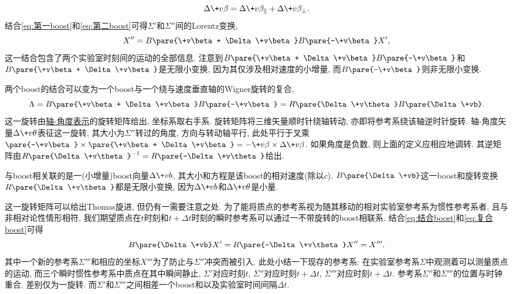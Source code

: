 \documentclass[hidelinks]{ctexart}
\begin{document}
\[ \Delta \+v\beta = \Delta \+v\beta_\parallel + \Delta \+v\beta_\perp. \]
结合\eqref{eq:第一boost}和\eqref{eq:第二boost}可得$\Sigma'$和$\Sigma''$间的Lorentz变换,
\begin{equation}
    \label{eq:结合boost}
    X'' = B\pare{\+v\beta + \Delta \+v\beta}B\pare{-\+v\beta}X',
\end{equation}
这一结合包含了两个实验室时刻间的运动的全部信息. 注意到$B\pare{\+v\beta + \Delta \+v\beta}B\pare{-\+v\beta}$和$B\pare{\+v\beta + \Delta \+v\beta}$是无限小变换, 因为其仅涉及相对速度的小增量, 而$B\pare{-\+v\beta}$则非无限小变换.
\par
两个boost的结合可以变为一个boost与一个绕与速度垂直轴的Wigner旋转的复合,
\begin{equation}
    \label{eq:复合boost}
    \Lambda = B\pare{\+v\beta + \Delta \+v\beta}B\pare{-\+v\beta} = R\pare{\Delta \+v\theta}B\pare{\Delta \+vb}.
\end{equation}
这一旋转由\href{https://en.wikipedia.org/wiki/Axis%E2%80%93angle_representation}{轴-角度表示}的旋转矩阵给出, 坐标系取右手系. 旋转矩阵将三维矢量顺时针绕轴转动, 亦即将参考系绕该轴逆时针旋转. 轴-角度矢量$\Delta \+v\theta$表征这一旋转, 其大小为$\Sigma''$转过的角度, 方向与转动轴平行, 此处平行于叉乘$\pare{-\+v\beta}\times \pare{\+v\beta + \Delta \+v\beta} = -\+v\beta\times\Delta\+v\beta$. 如果角度是负数, 则上面的定义应相应地调转. 其逆矩阵由$R\pare{\Delta \+v\theta}^{-1} = R\pare{-\Delta \+v\theta}$给出.
\par
与boost相关联的是一(小增量)boost向量$\Delta \+vb$, 其大小和方程是该boost的相对速度(除以$c$). $B\pare{\Delta \+vb}$这一boost和旋转变换$R\pare{\Delta \+v\theta}$都是无限小变换, 因为$\Delta \+vb$和$\Delta \+v\theta$是小量.
\par
这一旋转矩阵可以给出Thomas旋进, 但仍有一需要注意之处. 为了能将质点的参考系视为随其移动的相对实验室参考系为惯性参考系者, 且与非相对论性情形相符, 我们期望质点在$t$时刻和$t+\Delta t$时刻的瞬时参考系可以通过一不带旋转的boost相联系. 结合\eqref{eq:结合boost}和\eqref{eq:复合boost}可得
\begin{equation}
    \label{eq:第三boost}
    B\pare{\Delta \+vb} X' = R\pare{-\Delta \+v\theta}X'' = X'''.
\end{equation}
其中一个新的参考系$\Sigma'''$和相应的坐标$X'''$为了防止与$\Sigma''$冲突而被引入. 此处小结一下现存的参考系: 在实验室参考系$\Sigma$中观测着可以测量质点的运动, 而三个瞬时惯性参考系中质点在其中瞬间静止, $\Sigma'$对应时刻$t$, $\Sigma''$对应时刻$t+\Delta t$, $\Sigma'''$对应时刻$t+\Delta t$. 参考系$\Sigma''$和$\Sigma'''$的位置与时钟重合, 差别仅为一旋转. 而$\Sigma'$和$\Sigma'''$之间相差一个boost和以及实验室时间间隔$\Delta t$.
\end{document}
